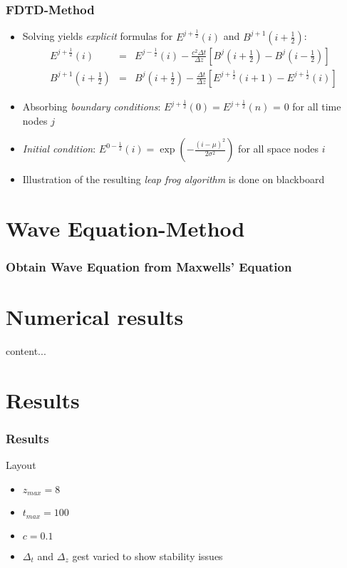 \documentclass[ignorenonframetext]{beamer}
\begin{document}
\begin{frame}
\frametitle{FDTD-Method}
\begin{itemize}
\item Solving yields \emph{explicit} formulas for $E^{j+\frac{1}{2}}(i)$ and $B^{j+1}(i+\frac{1}{2})$:
\begin{eqnarray}
E^{j+\frac{1}{2}}(i)&=& E^{j-\frac{1}{2}}(i) -  \frac{c^2 \Delta t}{\Delta z} \left[B^j(i+\frac{1}{2}) - B^j(i-\frac{1}{2})\right] \nonumber\\
B^{j+1}(i+\frac{1}{2}) &=& B^{j}(i+\frac{1}{2}) - \frac{\Delta t}{\Delta z}\left[E^{j+\frac{1}{2}}(i+1) - E^{j+\frac{1}{2}}(i)\right]
\end{eqnarray}
\item Absorbing \emph{boundary conditions}: $E^{j+\frac{1}{2}}(0) = E^{j+\frac{1}{2}}(n)$ = 0 for all time nodes $j$
\item \emph{Initial condition}: $E^{0-\frac{1}{2}}(i) = \exp\left(-\frac{(i - \mu)^2}{2 \sigma^2}\right)$ for all space nodes $i$
\item Illustration of the resulting \emph{leap frog algorithm} is done on blackboard 
\end{itemize}
\end{frame}


\section{Wave Equation-Method}
\begin{frame}
\frametitle{Obtain Wave Equation from Maxwells' Equation}
\end{frame}
\section{Numerical results}
\begin{frame}
content...
\end{frame}

\section{Results}
\begin{frame}
\frametitle{Results}
Layout
\begin{itemize}
\item $z_{max} = 8$
\item $t_{max} = 100$
\item $c = 0.1$
\item $\Delta_t$ and $\Delta_z$ gest varied to show stability issues
\end{itemize}
\end{frame}
\end{document}
